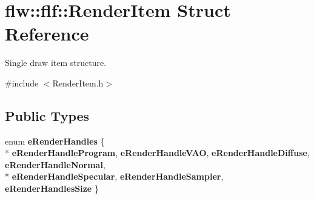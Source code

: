 \hypertarget{structflw_1_1flf_1_1RenderItem}{}\section{flw\+:\+:flf\+:\+:Render\+Item Struct Reference}
\label{structflw_1_1flf_1_1RenderItem}


Single draw item structure.  




{\ttfamily \#include $<$Render\+Item.\+h$>$}

\subsection*{Public Types}
\begin{DoxyCompactItemize}
\item 
enum {\bfseries e\+Render\+Handles} \{ \\*
{\bfseries e\+Render\+Handle\+Program}, 
{\bfseries e\+Render\+Handle\+V\+AO}, 
{\bfseries e\+Render\+Handle\+Diffuse}, 
{\bfseries e\+Render\+Handle\+Normal}, 
\\*
{\bfseries e\+Render\+Handle\+Specular}, 
{\bfseries e\+Render\+Handle\+Sampler}, 
{\bfseries e\+Render\+Handles\+Size}
 \}\hypertarget{structflw_1_1flf_1_1RenderItem_aa6b3d77e6446873ee9dcfc072b7c62a0}{}\label{structflw_1_1flf_1_1RenderItem_aa6b3d77e6446873ee9dcfc072b7c62a0}

\end{DoxyCompactItemize}
